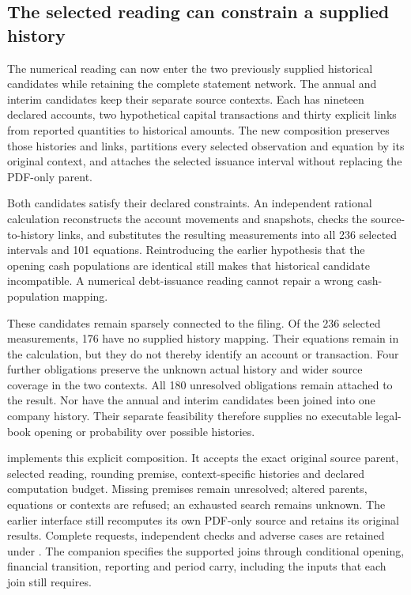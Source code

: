 \subsection{The selected reading can constrain a supplied history}
\label{sec:selected-reading-history}

The numerical reading can now enter the two previously supplied historical
candidates while retaining the complete statement network. The annual and
interim candidates keep their separate source contexts. Each has nineteen
declared accounts, two hypothetical capital transactions and thirty explicit
links from reported quantities to historical amounts. The new composition
preserves those histories and links, partitions every selected observation
and equation by its original context, and attaches the selected issuance
interval without replacing the PDF-only parent.

Both candidates satisfy their declared constraints. An independent rational
calculation reconstructs the account movements and snapshots, checks the
source-to-history links, and substitutes the resulting measurements into all
236 selected intervals and 101 equations. Reintroducing the earlier hypothesis
that the opening cash populations are identical still makes that historical
candidate incompatible. A numerical debt-issuance reading cannot repair a
wrong cash-population mapping.

These candidates remain sparsely connected to the filing. Of the 236 selected
measurements, 176 have no supplied history mapping. Their equations remain
in the calculation, but they do not thereby identify an account or transaction.
Four further obligations preserve the unknown actual history and wider source
coverage in the two contexts. All 180 unresolved obligations remain attached
to the result. Nor have the annual and interim candidates been joined into one
company history. Their separate feasibility therefore supplies no executable
legal-book opening or probability over possible histories.

 implements this explicit composition.
It accepts the exact original source parent, selected reading, rounding premise,
context-specific histories and declared computation budget. Missing premises
remain unresolved; altered parents, equations or contexts are refused; an
exhausted search remains unknown. The earlier interface still recomputes its
own PDF-only source and retains its original results. Complete requests,
independent checks and adverse cases are retained under
.
The companion  specifies the
supported joins through conditional opening, financial transition, reporting
and period carry, including the inputs that each join still requires.

